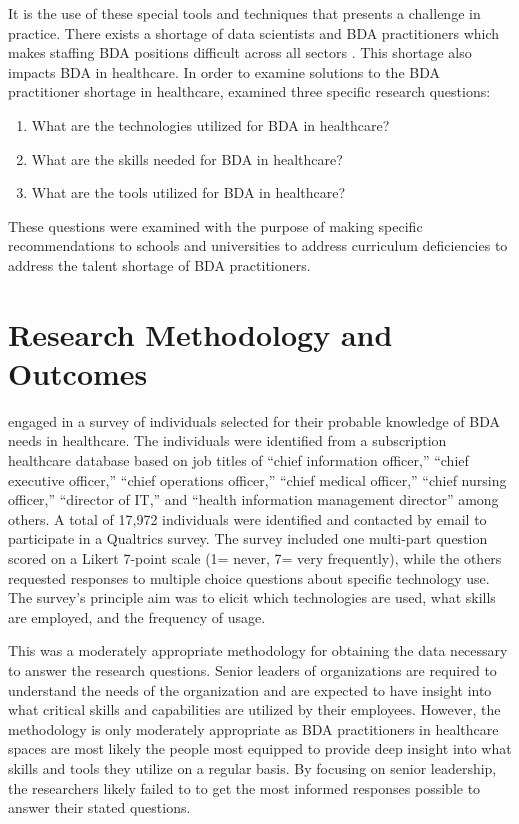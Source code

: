 It is the use of these special tools and techniques that presents a challenge in practice. There exists a shortage of data scientists and BDA practitioners which makes staffing BDA positions difficult across all sectors \parencite{willettsBarriersSMEsAdoption2020}. This shortage also impacts BDA in healthcare. In order to examine solutions to the BDA practitioner shortage in healthcare, \textcite{dolezelBigDataAnalytics2019} examined three specific research questions:

\begin{enumerate}
  \item What are the technologies utilized for BDA in healthcare?
  \item What are the skills needed for BDA in healthcare?
  \item What are the tools utilized for BDA in healthcare?
\end{enumerate}

These questions were examined with the purpose of making specific recommendations to schools and universities to address curriculum deficiencies to address the talent shortage of BDA practitioners.

\section{Research Methodology and Outcomes}

\textcite{dolezelBigDataAnalytics2019} engaged in a survey of individuals selected for their probable knowledge of BDA needs in healthcare. The individuals were identified from a subscription healthcare database based on job titles of ``chief information officer,'' ``chief executive officer,'' ``chief operations officer,'' ``chief medical officer,'' ``chief nursing officer,'' ``director of IT,'' and ``health information management director'' among others. A total of 17,972 individuals were identified and contacted by email to participate in a Qualtrics survey. The survey included one multi-part question scored on a Likert 7-point scale (1= never, 7= very frequently), while the others requested responses to multiple choice questions about specific technology use. The survey's principle aim was to elicit which technologies are used, what skills are employed, and the frequency of usage.

This was a moderately appropriate methodology for obtaining the data necessary to answer the research questions. Senior leaders of organizations are required to understand the needs of the organization and are expected to have insight into what critical skills and capabilities are utilized by their employees. However, the methodology is only moderately appropriate as BDA practitioners in healthcare spaces are most likely the people most equipped to provide deep insight into what skills and tools they utilize on a regular basis. By focusing on senior leadership, the researchers likely failed to to get the most informed responses possible to answer their stated questions.

